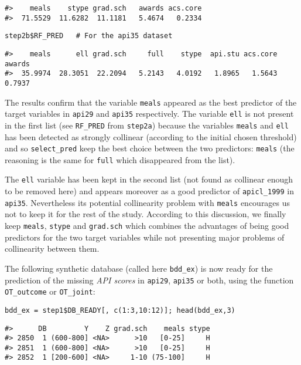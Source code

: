 \begin{verbatim}
#>    meals    stype grad.sch   awards acs.core 
#>  71.5529  11.6282  11.1181   5.4674   0.2334
\end{verbatim}

\begin{verbatim}
step2b$RF_PRED   # For the api35 dataset
\end{verbatim}

\begin{verbatim}
#>    meals      ell grad.sch     full    stype  api.stu acs.core   awards 
#>  35.9974  28.3051  22.2094   5.2143   4.0192   1.8965   1.5643   0.7937
\end{verbatim}

The results confirm that the variable \texttt{meals} appeared as the best predictor of the target variables in \texttt{api29} and \texttt{api35} respectively. The variable \texttt{ell} is not present in the first list (see \texttt{RF\_PRED} from \texttt{step2a}) because the variables \texttt{meals} and \texttt{ell} has been detected as strongly collinear (according to the initial chosen threshold) and so \texttt{select\_pred} keep the best choice between the two predictors: \texttt{meals} (the reasoning is the same for \texttt{full} which disappeared from the list).

The \texttt{ell} variable has been kept in the second list (not found as collinear enough to be removed here)
and appears moreover as a good predictor of \texttt{apicl\_1999} in \texttt{api35}. Nevertheless its potential collinearity
problem with \texttt{meals} encourages us not to keep it for the rest of the study. According to this discussion, we
finally keep \texttt{meals}, \texttt{stype} and \texttt{grad.sch} which combines the advantages of being good predictors for the
two target variables while not presenting major problems of collinearity between them.

The following synthetic database (called here \texttt{bdd\_ex}) is now ready for the prediction of the missing \emph{API
scores} in \texttt{api29}, \texttt{api35} or both, using the function \texttt{OT\_outcome} or \texttt{OT\_joint}:

\begin{verbatim}
bdd_ex = step1$DB_READY[, c(1:3,10:12)]; head(bdd_ex,3)
\end{verbatim}

\begin{verbatim}
#>      DB         Y    Z grad.sch    meals stype
#> 2850  1 (600-800] <NA>      >10   [0-25]     H
#> 2851  1 (600-800] <NA>      >10   [0-25]     H
#> 2852  1 [200-600] <NA>     1-10 (75-100]     H
\end{verbatim}

